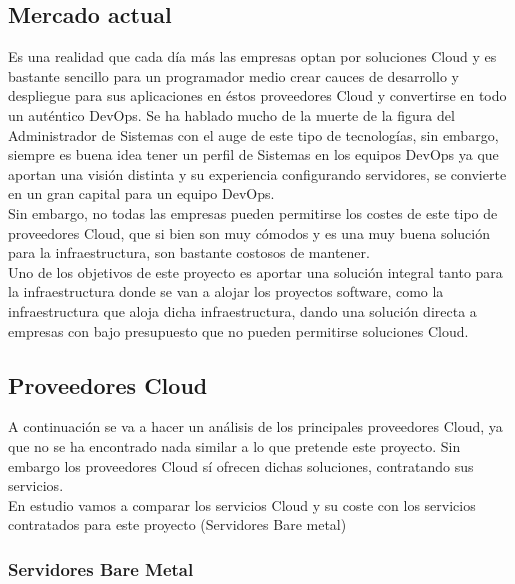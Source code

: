 	\subsection{Mercado actual}
		\begin{text}
			Es una realidad que cada día más las empresas optan por soluciones Cloud y es bastante sencillo para un programador medio crear cauces de desarrollo y despliegue para sus aplicaciones en éstos proveedores Cloud y convertirse en todo un auténtico DevOps. Se ha hablado mucho de la muerte de la figura del Administrador de Sistemas con el auge de este tipo de tecnologías, sin embargo, siempre es buena idea tener un perfil de Sistemas en los equipos DevOps ya que aportan una visión distinta y su experiencia configurando servidores, se convierte en un gran capital para un equipo DevOps. \\ 
			Sin embargo, no todas las empresas pueden permitirse los costes de este tipo de proveedores Cloud, que si bien son muy cómodos y es una muy buena solución para la infraestructura, son bastante costosos de mantener. \\
			Uno de los objetivos de este proyecto es aportar una solución integral tanto para la infraestructura donde se van a alojar los proyectos software, como la infraestructura que aloja dicha infraestructura, dando una solución directa a empresas con bajo presupuesto que no pueden permitirse soluciones Cloud. \\
		\end{text}
	\clearpage
	
	\subsection{Proveedores Cloud}
		\begin{text}
			A continuación se va a hacer un análisis de los principales proveedores Cloud, ya que no se ha encontrado nada similar a lo que pretende este proyecto. Sin embargo los proveedores Cloud sí ofrecen dichas soluciones, contratando sus servicios. \\
			En estudio vamos a comparar los servicios Cloud y su coste con los servicios contratados para este proyecto (Servidores Bare metal) \\
		\end{text}
	
		\subsubsection{Servidores Bare Metal}
			\label{servidores_bare_metal}

